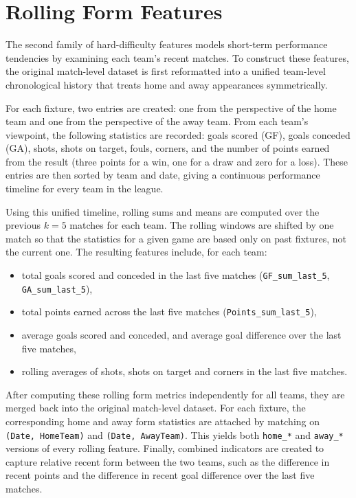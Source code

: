 \documentclass[11pt,a4paper]{article}
\begin{document}
\section{Rolling Form Features}

The second family of hard-difficulty features models short-term performance tendencies by examining each team’s recent matches. To construct these features, the original match-level dataset is first reformatted into a unified team-level chronological history that treats home and away appearances symmetrically.

For each fixture, two entries are created: one from the perspective of the home team and one from the perspective of the away team. From each team’s viewpoint, the following statistics are recorded: goals scored (GF), goals conceded (GA), shots, shots on target, fouls, corners, and the number of points earned from the result (three points for a win, one for a draw and zero for a loss). These entries are then sorted by team and date, giving a continuous performance timeline for every team in the league.

Using this unified timeline, rolling sums and means are computed over the previous $k = 5$ matches for each team. The rolling windows are shifted by one match so that the statistics for a given game are based only on past fixtures, not the current one. The resulting features include, for each team:
\begin{itemize}
    \item total goals scored and conceded in the last five matches (\texttt{GF\_sum\_last\_5}, \texttt{GA\_sum\_last\_5}),
    \item total points earned across the last five matches (\texttt{Points\_sum\_last\_5}),
    \item average goals scored and conceded, and average goal difference over the last five matches,
    \item rolling averages of shots, shots on target and corners in the last five matches.
\end{itemize}

After computing these rolling form metrics independently for all teams, they are merged back into the original match-level dataset. For each fixture, the corresponding home and away form statistics are attached by matching on \texttt{(Date, HomeTeam)} and \texttt{(Date, AwayTeam)}. This yields both \texttt{home\_*} and \texttt{away\_*} versions of every rolling feature. Finally, combined indicators are created to capture relative recent form between the two teams, such as the difference in recent points and the difference in recent goal difference over the last five matches.
\end{document}
